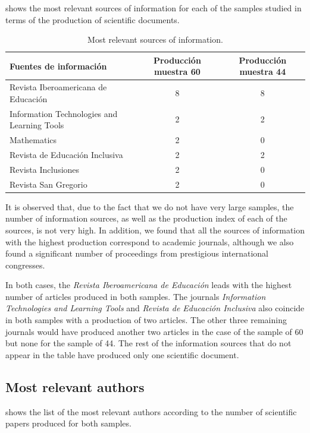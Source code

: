 \documentclass[english]{textolivre}
\begin{document}
 shows the most relevant sources of information for each of the samples studied in terms of the production of scientific documents.

\begin{table}[h!]
\centering
\caption{Most relevant sources of information.}\label{Table02}
\begin{tabular}{lcc}
\toprule
Fuentes de información & Producción muestra 60 & Producción muestra 44 \\
\hline
Revista Iberoamericana de Educación & 8 & 8 \\
Information Technologies and Learning Tools & 2 & 2 \\
Mathematics & 2 & 0 \\
Revista de Educación Inclusiva & 2 & 2 \\
Revista Inclusiones & 2 & 0 \\
Revista San Gregorio & 2 & 0 \\
\hline
\end{tabular}
\end{table}

It is observed that, due to the fact that we do not have very large samples, the number of information sources, as well as the production index of each of the sources, is not very high. In addition, we found that all the sources of information with the highest production correspond to academic journals, although we also found a significant number of proceedings from prestigious international congresses.

In both cases, the \textit{Revista Iberoamericana de Educación} leads with the highest number of articles produced in both samples. The journals \textit{Information Technologies and Learning Tools} and \textit{Revista de Educación Inclusiva} also coincide in both samples with a production of two articles. The other three remaining journals would have produced another two articles in the case of the sample of 60 but none for the sample of 44. The rest of the information sources that do not appear in the table have produced only one scientific document.

\subsection{Most relevant authors}

 shows the list of the most relevant authors according to the number of scientific papers produced for both samples.  
\end{document}
